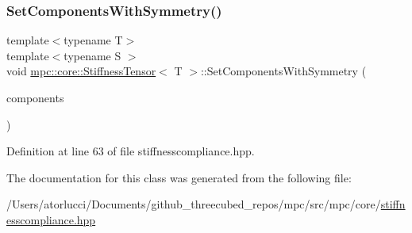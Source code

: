 \subsubsection{\texorpdfstring{Set\+Components\+With\+Symmetry()}{SetComponentsWithSymmetry()}}
{\footnotesize\ttfamily template$<$typename T$>$ \\
template$<$typename S $>$ \\
void \mbox{\hyperlink{structmpc_1_1core_1_1_stiffness_tensor}{mpc\+::core\+::\+Stiffness\+Tensor}}$<$ T $>$\+::Set\+Components\+With\+Symmetry (\begin{DoxyParamCaption}\item[{std\+::set$<$ \mbox{\hyperlink{namespacempc_1_1core_ac3a232afc7c680d580628e834030482f}{mpc\+::core\+::\+Tensor\+Rank4\+Component}}$<$ T $>$ $>$ \&}]{components }\end{DoxyParamCaption})\hspace{0.3cm}{\ttfamily [inline]}}



Definition at line 63 of file stiffnesscompliance.\+hpp.



The documentation for this class was generated from the following file\+:\begin{DoxyCompactItemize}
\item 
/\+Users/atorlucci/\+Documents/github\+\_\+threecubed\+\_\+repos/mpc/src/mpc/core/\mbox{\hyperlink{stiffnesscompliance_8hpp}{stiffnesscompliance.\+hpp}}\end{DoxyCompactItemize}
